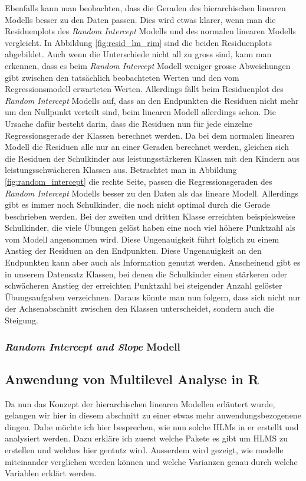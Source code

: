 \documentclass[12pt]{article}\usepackage[]{graphicx}\usepackage[]{color}
\numberwithin{equation}{section}
\begin{document}
Ebenfalls kann man beobachten, dass die Geraden des hierarchischen linearen Modells besser zu den Daten passen. Dies wird etwas klarer, wenn man die Residuenplots des \textit{Random Intercept} Modells und des normalen linearen Modells vergleicht. In Abbildung \ref{fig:resid_lm_rim} sind die beiden Residuenplots abgebildet. Auch wenn die Unterschiede nicht all zu gross sind, kann man erkennen, dass es beim \textit{Random Intercept} Modell weniger grosse Abweichungen gibt zwischen den tatsächlich beobachteten Werten und den vom Regressionsmodell erwarteten Werten. Allerdings fällt beim Residuenplot des \textit{Random Intercept} Modells auf, dass an den Endpunkten die Residuen nicht mehr um den Nullpunkt verteilt sind, beim linearen Modell allerdings schon. Die Ursache dafür besteht darin, dass die Residuen nun für jede einzelne Regressionsgerade der Klassen berechnet werden. Da bei dem normalen linearen Modell die Residuen alle nur an einer Geraden berechnet werden, gleichen sich die Residuen der Schulkinder aus leistungsstärkeren Klassen mit den Kindern aus leistungsschwächeren Klassen aus. Betrachtet man in Abbildung \ref{fig:random_intercept} die rechte Seite, passen die Regressionsgeraden des \textit{Random Intercept} Modells besser zu den Daten als das lineare Modell. Allerdings gibt es immer noch Schulkinder, die noch nicht optimal durch die Gerade beschrieben werden. Bei der zweiten und dritten Klasse erreichten beispielsweise Schulkinder, die viele Übungen gelöst haben eine noch viel höhere Punktzahl als vom Modell angenommen wird. Diese Ungenauigkeit führt folglich zu einem Anstieg der Residuen an den Endpunkten. Diese Ungenauigkeit an den Endpunkten kann aber auch als Information genutzt werden. Anscheinend gibt es in unserem Datensatz Klassen, bei denen die Schulkinder einen stärkeren oder schwächeren Anstieg der erreichten Punktzahl bei steigender Anzahl gelöster Übungsaufgaben verzeichnen. Daraus könnte man nun folgern, dass sich nicht nur der Achsenabschnitt zwischen den Klassen unterscheidet, sondern auch die Steigung.






\subsubsection{\textit{Random Intercept and Slope} Modell}

\subsection{Anwendung von Multilevel Analyse in R} \label{section:ml_in_R}
Da nun das Konzept der hierarchischen linearen Modellen erläutert wurde, gelangen wir hier in diesem abschnitt zu einer etwas mehr anwendungsbezogenene dingen. Dabe möchte ich hier besprechen, wie nun solche HLMs in er erstellt und analysiert werden. Dazu erkläre ich zuerst welche Pakete es gibt um HLMS zu erstellen und welches hier gentutz wird. Ausserdem wird gezeigt, wie modelle miteinander verglichen werden können und welche Varianzen genau durch welche Variablen erklärt werden. 
\end{document}
